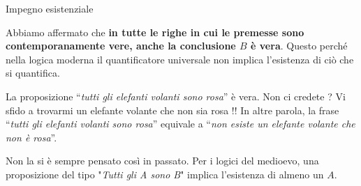 \documentclass[10pt,dvipsnames,xcolor=table,handout]{beamer}
\begin{document}
\begin{frame}{Impegno esistenziale}
    \medskip

    \medskip
    Abbiamo affermato che \textbf{in tutte le righe in cui le premesse sono contemporanamente vere, anche la conclusione $B$ è vera}. Questo perché nella logica moderna il quantificatore universale non implica l'esistenza di ciò che si quantifica.

    \medskip
    La proposizione ``\emph{tutti gli elefanti volanti sono rosa}'' è vera. Non ci credete ? Vi sfido a trovarmi un elefante volante che non sia rosa !! In altre parola, la frase ``\emph{tutti gli elefanti volanti sono rosa}'' equivale a ``\emph{non esiste un elefante volante che non è rosa}''.


    \medskip
    Non la si è sempre pensato così in passato. Per i logici del medioevo, una proposizione del tipo "\emph{Tutti gli A sono B}" implica l'esistenza di almeno un $A$.
\end{frame}
\end{document}
